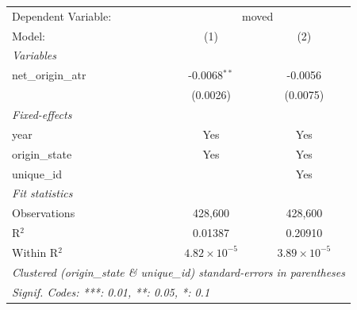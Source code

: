 
\begingroup
\centering
\small
\begin{tabular}{lcc}
   \tabularnewline \midrule \midrule
   Dependent Variable: & \multicolumn{2}{c}{moved}\\
   Model:             & (1)                   & (2)\\  
   \midrule
   \emph{Variables}\\
   net\_origin\_atr   & -0.0068$^{**}$        & -0.0056\\   
                      & (0.0026)              & (0.0075)\\   
   \midrule
   \emph{Fixed-effects}\\
   year               & Yes                   & Yes\\  
   origin\_state      & Yes                   & Yes\\  
   unique\_id         &                       & Yes\\  
   \midrule
   \emph{Fit statistics}\\
   Observations       & 428,600               & 428,600\\  
   R$^2$              & 0.01387               & 0.20910\\  
   Within R$^2$       & $4.82\times 10^{-5}$  & $3.89\times 10^{-5}$\\   
   \midrule \midrule
   \multicolumn{3}{l}{\emph{Clustered (origin\_state \& unique\_id) standard-errors in parentheses}}\\
   \multicolumn{3}{l}{\emph{Signif. Codes: ***: 0.01, **: 0.05, *: 0.1}}\\
\end{tabular}
\par\endgroup


